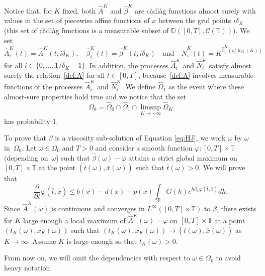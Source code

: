 \documentclass[JEP,XML,SOM,Unicode,published]{cedram}
\let\cal\mathcal
\theoremstyle{plain}
\theoremstyle{remark}
\newcommand\T{\mathbb{T}}
\newcommand\R{\mathbb{R}}
\begin{document}
Notice that, for $K$ fixed, both $\widehat{A}^K$ and $\widehat{\beta}^K$ are càdlàg functions almost surely with values in the set of piecewise affine functions of $x$ between the grid points $i\delta_K$ (this set of càdlàg functions is a measurable subset of $\mathbb{D}([0,T],{\cal C}(\mathbb{T}))$). We set
\[
\widehat{A}^K_i(t)=\widehat{A}^K(t,i\delta_K),\quad\widehat{\beta}^K_i(t)=\widehat{\beta}^K(t,i\delta_K)\quad\text{and}\quad\widehat{N}^K_i(t)=K^{\widehat{\beta}^K_i(t/\log(K))}
\]
for all $i\in \{0,\dots ,1/\delta_K-1\}$. In addition, the processes $\widehat{A}^K_i$ and $\widehat{N}^K_i$ satisfy almost surely the relation~\eqref{def:A} for all $t\in [0,T]$, because~\eqref{def:A} involves measurable functions of the processes $\widehat{A}^K_i$ and $\widehat{N}^K_i$. We define $\widehat{\Omega}_1$ as the event where these almost-sure properties hold true and we notice that the set
\[
\Omega_0=\widehat{\Omega}_0\cap \widehat{\Omega}_1\cap \limsup_{K\to+\infty} \widehat{\Omega}_K
\]
has probability 1.

To prove that $\beta$ is a viscosity sub-solution of Equation \eqref{eq:HJ}, we work $\omega$ by $\omega$ in~$\Omega_0$.
Let $\omega\in\Omega_0$ and $T>0$ and consider a smooth function $\varphi:[0,T]\times\T$ (depending on~$\omega$) such that $\widehat{\beta}(\omega)-\varphi$ attains a strict {global} maximum on {$[0,T]\times\T$} at the point $(\bar t(\omega),\bar x(\omega))$ such that $\bar{t}(\omega)>0$. We will prove that
\[
\frac{\partial}{\partial t} \varphi(\bar t,\bar x) \leq {b(\bar x)-d(\bar x)}+ p(x) \int_{\R} G(h)e^{h\partial_x \varphi(\bar t,\bar x)} dh.
\]
Since $\widehat{A}^K(\omega)$ is continuous and converges in $L^\infty([0,T]\times\T)$ to $\beta$, there exists for $K$ large enough a local maximum of $\widehat{A}^K(\omega)-\varphi$ on $[0,T]\times\T$ at a point $(t_K(\omega),x_K(\omega))$ such that $(t_K(\omega),x_K(\omega))\to (\bar t(\omega),\bar x(\omega))$ as $K\to \infty$. Assume $K$ is large enough so that $t_K(\omega)>0$. 

From now on, we will omit the dependencies with respect to $\omega\in\Omega_0$ to avoid heavy notation.
\end{document}
